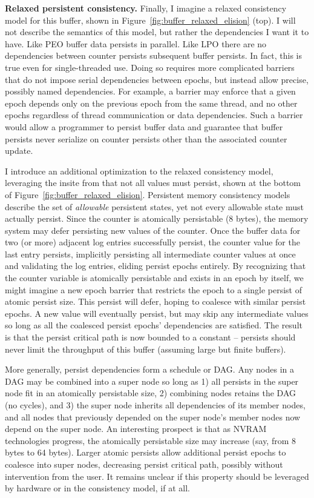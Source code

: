 \textbf{Relaxed persistent consistency.}
Finally, I imagine a relaxed consistency model for this buffer, shown in Figure~\ref{fig:buffer_relaxed_elision} (top).
I will not describe the semantics of this model, but rather the dependencies I want it to have.
Like PEO buffer data persists in parallel.
Like LPO there are no dependencies between counter persists subsequent buffer persists.
In fact, this is true even for single-threaded use.
Doing so requires more complicated barriers that do not impose serial dependencies between epochs, but instead allow precise, possibly named dependencies.
For example, a barrier may enforce that a given epoch depends only on the previous epoch from the same thread, and no other epochs regardless of thread communication or data dependencies.
Such a barrier would allow a programmer to persist buffer data and guarantee that buffer persists never serialize on counter persists other than the associated counter update.

I introduce an additional optimization to the relaxed consistency model, leveraging the insite from \cite{FangHsiao11} that not all values must persist, shown at the bottom of Figure~\ref{fig:buffer_relaxed_elision}.
Persistent memory consistency models describe the set of \emph{allowable} persistent states, yet not every allowable state must actually persist.
Since the counter is atomically persistable (8 bytes), the memory system may defer persisting new values of the counter.
Once the buffer data for two (or more) adjacent log entries successfully persist, the counter value for the last entry persists, implicitly persisting all intermediate counter values at once and validating the log entries, eliding persist epochs entirely.
By recognizing that the counter variable is atomically persistable and exists in an epoch by itself, we might imagine a new epoch barrier that restricts the epoch to a single persist of atomic persist size.
This persist will defer, hoping to coalesce with similar persist epochs.
A new value will eventually persist, but may skip any intermediate values so long as all the coalesced persist epochs' dependencies are satisfied.
The result is that the persist critical path is now bounded to a constant -- persists should never limit the throughput of this buffer (assuming large but finite buffers).

More generally, persist dependencies form a schedule or DAG.
Any nodes in a DAG may be combined into a super node so long as 1) all persists in the super node fit in an atomically persistable size, 2) combining nodes retains the DAG (no cycles), and 3) the super node inherits all dependencies of its member nodes, and all nodes that previously depended on the super node's member nodes now depend on the super node.
An interesting prospect is that as NVRAM technologies progress, the atomically persistable size may increase (say, from 8 bytes to 64 bytes).
Larger atomic persists allow additional persist epochs to coalesce into super nodes, decreasing persist critical path, possibly without intervention from the user.
It remains unclear if this property should be leveraged by hardware or in the consistency model, if at all.

